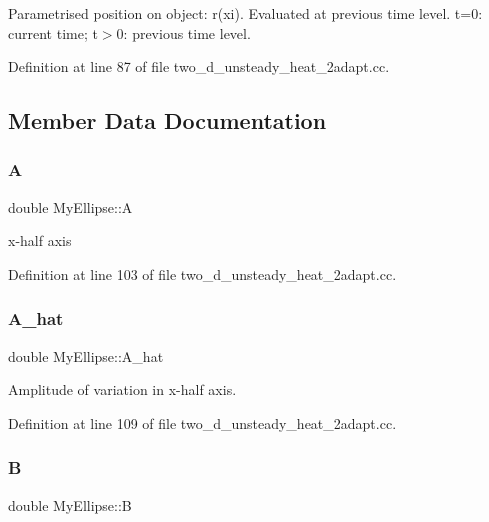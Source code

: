 Parametrised position on object\+: r(xi). Evaluated at previous time level. t=0\+: current time; t$>$0\+: previous time level. 



Definition at line 87 of file two\+\_\+d\+\_\+unsteady\+\_\+heat\+\_\+2adapt.\+cc.



\subsection{Member Data Documentation}
\mbox{\label{classMyEllipse_aa2a0efd0a39f9d4fc307a6ff011682ed}} 
\subsubsection{\texorpdfstring{A}{A}}
{\footnotesize\ttfamily double My\+Ellipse\+::A\hspace{0.3cm}{\ttfamily [protected]}}



x-\/half axis 



Definition at line 103 of file two\+\_\+d\+\_\+unsteady\+\_\+heat\+\_\+2adapt.\+cc.

\mbox{\label{classMyEllipse_a653e71cf296cdc86cc595d16f18004dd}} 
\subsubsection{\texorpdfstring{A\+\_\+hat}{A\_hat}}
{\footnotesize\ttfamily double My\+Ellipse\+::\+A\+\_\+hat\hspace{0.3cm}{\ttfamily [protected]}}



Amplitude of variation in x-\/half axis. 



Definition at line 109 of file two\+\_\+d\+\_\+unsteady\+\_\+heat\+\_\+2adapt.\+cc.

\mbox{\label{classMyEllipse_a8f991996b9040fe94b942eab7e51f0af}} 
\subsubsection{\texorpdfstring{B}{B}}
{\footnotesize\ttfamily double My\+Ellipse\+::B\hspace{0.3cm}{\ttfamily [protected]}}



